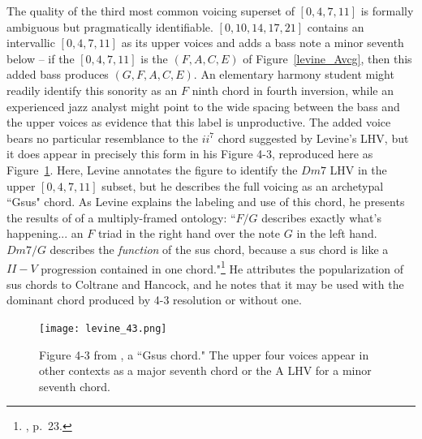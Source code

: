 The quality of the third most common voicing superset of $[0,4,7,11]$ is formally ambiguous but pragmatically identifiable.  $[0,10,14,17,21]$ contains an intervallic $[0,4,7,11]$ as its upper voices and adds a bass note a minor seventh below -- if the $[0,4,7,11]$ is the $(F,A,C,E)$ of Figure~\ref{levine_Avcg}, then this added bass produces $(G,F,A,C,E)$.  An elementary harmony student might readily identify this sonority as an $F$ ninth chord in fourth inversion, while an experienced jazz analyst might point to the wide spacing between the bass and the upper voices as evidence that this label is unproductive.  The added voice bears no particular resemblance to the $ii^7$ chord suggested by Levine's LHV, but it does appear in precisely this form in his Figure 4-3, reproduced here as Figure~\ref{Gsus}.  Here, Levine annotates the figure to identify the $Dm7$ LHV in the upper $[0,4,7,11]$ subset, but he describes the full voicing as an archetypal ``Gsus" chord.  As Levine explains the labeling and use of this chord, he presents the results of of a multiply-framed ontology: ``$F/G$ describes exactly what's happening... an $F$ triad in the right hand over the note $G$ in the left hand.  $Dm7/G$ describes the \emph{function} of the sus chord, because a sus chord is like a $II-V$ progression contained in one chord."\footnote{\cite{levine1989}, p.\ 23.}  He attributes the popularization of sus chords to Coltrane and Hancock, and he notes that it may be used with the dominant chord produced by 4-3 resolution or without one.

\begin{figure}
	\centering
	\caption{Figure 4-3 from \cite{levine1989}, a ``Gsus chord."  The upper four voices appear in other contexts as a major seventh chord or the A LHV for a minor seventh chord.}
	\texttt{[image: levine\_43.png]}
	\label{Gsus}
\end{figure}

